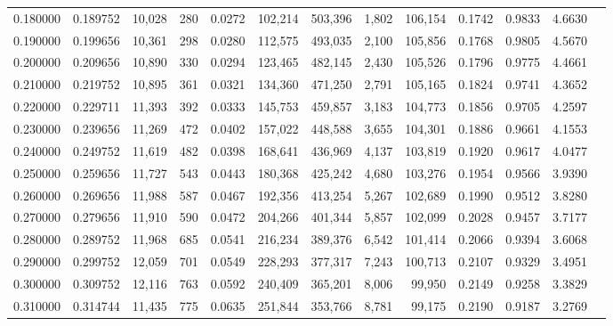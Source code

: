 \begin{tabular}{rrrrrrrrrrrrr}
0.180000 & 0.189752 & 10,028 &   280 &                                     0.0272 & 102,214 & 503,396 &   1,802 & 106,154 & 0.1742 & 0.9833 & 4.6630 \\
0.190000 & 0.199656 & 10,361 &   298 &                                     0.0280 & 112,575 & 493,035 &   2,100 & 105,856 & 0.1768 & 0.9805 & 4.5670 \\
0.200000 & 0.209656 & 10,890 &   330 &                                     0.0294 & 123,465 & 482,145 &   2,430 & 105,526 & 0.1796 & 0.9775 & 4.4661 \\
0.210000 & 0.219752 & 10,895 &   361 &                                     0.0321 & 134,360 & 471,250 &   2,791 & 105,165 & 0.1824 & 0.9741 & 4.3652 \\
0.220000 & 0.229711 & 11,393 &   392 &                                     0.0333 & 145,753 & 459,857 &   3,183 & 104,773 & 0.1856 & 0.9705 & 4.2597 \\
0.230000 & 0.239656 & 11,269 &   472 &                                     0.0402 & 157,022 & 448,588 &   3,655 & 104,301 & 0.1886 & 0.9661 & 4.1553 \\
0.240000 & 0.249752 & 11,619 &   482 &                                     0.0398 & 168,641 & 436,969 &   4,137 & 103,819 & 0.1920 & 0.9617 & 4.0477 \\
0.250000 & 0.259656 & 11,727 &   543 &                                     0.0443 & 180,368 & 425,242 &   4,680 & 103,276 & 0.1954 & 0.9566 & 3.9390 \\
0.260000 & 0.269656 & 11,988 &   587 &                                     0.0467 & 192,356 & 413,254 &   5,267 & 102,689 & 0.1990 & 0.9512 & 3.8280 \\
0.270000 & 0.279656 & 11,910 &   590 &                                     0.0472 & 204,266 & 401,344 &   5,857 & 102,099 & 0.2028 & 0.9457 & 3.7177 \\
0.280000 & 0.289752 & 11,968 &   685 &                                     0.0541 & 216,234 & 389,376 &   6,542 & 101,414 & 0.2066 & 0.9394 & 3.6068 \\
0.290000 & 0.299752 & 12,059 &   701 &                                     0.0549 & 228,293 & 377,317 &   7,243 & 100,713 & 0.2107 & 0.9329 & 3.4951 \\
0.300000 & 0.309752 & 12,116 &   763 &                                     0.0592 & 240,409 & 365,201 &   8,006 &  99,950 & 0.2149 & 0.9258 & 3.3829 \\
0.310000 & 0.314744 & 11,435 &   775 &                                     0.0635 & 251,844 & 353,766 &   8,781 &  99,175 & 0.2190 & 0.9187 & 3.2769 \\

\end{tabular}
